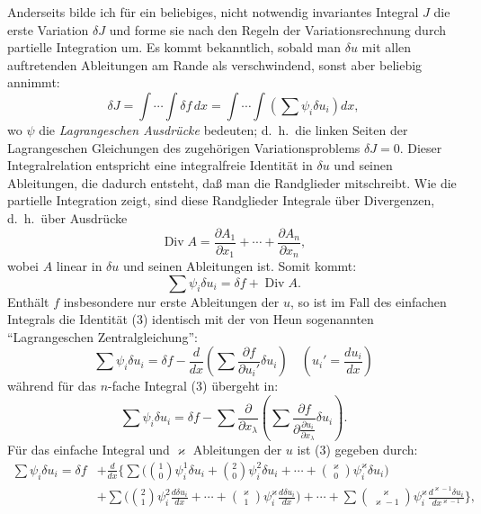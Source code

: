 \documentclass[12pt,a4paper]{article}
\begin{document}
Anderseits bilde ich f\"ur ein beliebiges, nicht notwendig invariantes Integral $J$ die erste Variation $\delta J$ und forme sie nach den Regeln der Variationsrechnung durch partielle Integration um. Es kommt bekanntlich, sobald man $\delta u$ mit allen auftretenden Ableitungen am Rande als verschwindend, sonst aber beliebig annimmt:
\begin{equation}\tag{2}
\delta J=\int\cdots\int\delta f\,dx=\int\cdots\int\left(\sum\psi_{i}\delta u_{i}\right)dx,
\end{equation}
wo $\psi$ die \emph{Lagrangeschen Ausdr\"ucke} bedeuten; d.\ h.\ die linken Seiten der Lagrangeschen Gleichungen des zugeh\"origen Variationsproblems $\delta J=0$. Dieser Integralrelation entspricht eine integralfreie Identit\"at in $\delta u$ und seinen Ableitungen, die dadurch entsteht, da\ss{} man die Randglieder mitschreibt. Wie die partielle Integration zeigt, sind diese Randglieder Integrale \"uber Divergenzen, d.\ h.\ \"uber Ausdr\"ucke
\[
\operatorname{Div}A=\frac{\partial A_{1}}{\partial x_{1}}+\cdots+\frac{\partial A_{n}}{\partial x_{n}},
\]
wobei $A$ linear in $\delta u$ und seinen Ableitungen ist. Somit kommt:
\begin{equation}\tag{3}
\sum\psi_{i}\delta u_{i}=\delta f+\operatorname{Div}A.
\end{equation}
Enth\"alt $f$ insbesondere nur erste Ableitungen der $u$, so ist im Fall des einfachen Integrals die Identit\"at (3) identisch mit der von Heun sogenannten ``Lagrangeschen Zentralgleichung'':
\begin{equation}\tag{4}
\sum\psi_{i}\delta u_{i}=\delta f-\frac{d}{dx}\left(\sum\frac{\partial f}{\partial u_{i}'}\delta u_{i}\right)\quad(u_{i}'=\frac{du_{i}}{dx})
\end{equation}
w\"ahrend f\"ur das $n$-fache Integral (3) \"ubergeht in:
\begin{equation}\tag{5}
\sum\psi_{i}\delta u_{i}=\delta f-\sum\frac{\partial}{\partial x_{\lambda}}\left(\sum\frac{\partial f}{\partial\frac{\partial u_{i}}{\partial x_{\lambda}}}\delta u_{i}\right).
\end{equation}
F\"ur das einfache Integral und $\varkappa$ Ableitungen der $u$ ist (3) gegeben durch:
\begin{equation}\tag{6}
\begin{aligned}
\sum\psi_{i}\delta u_{i}=\delta f&+\frac{d}{dx}\Biggl\{\sum\biggl(\binom{1}{0}\psi_{i}^{1}\delta u_{i}+\binom{2}{0}\psi_{i}^{2}\delta u_{i}+\cdots+\binom{\varkappa}{0}\psi_{i}^{\varkappa}\delta u_{i}\biggr)\\
&+\sum\biggl(\binom{2}{1}\psi_{i}^{2}\frac{d\delta u_{i}}{dx}+\cdots+\binom{\varkappa}{1}\psi_{i}^{\varkappa}\frac{d\delta u_{i}}{dx}\biggr)+\cdots+\sum\binom{\varkappa}{\varkappa-1}\psi_{i}^{\varkappa}\frac{d^{\varkappa-1}\delta u_{i}}{dx^{\varkappa-1}}\Biggr\},
\end{aligned}
\end{equation}
\end{document}

